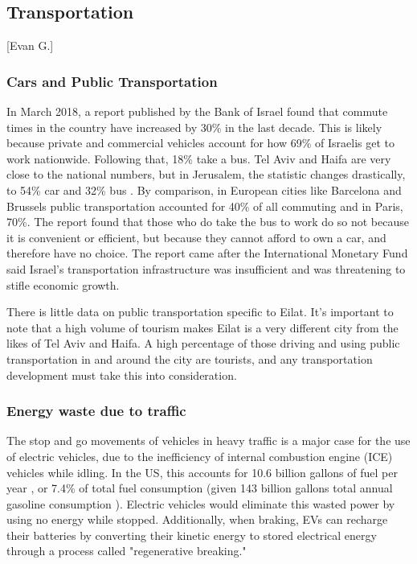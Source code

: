 \documentclass[12pt]{article}                         %
\begin{document}
\subsection{Transportation}[Evan G.]
\subsubsection{Cars and Public Transportation}
In March 2018, a report published by the Bank of Israel found that commute times in the country have increased by 30\% in the last decade. This is likely because private and commercial vehicles account for how 69\% of Israelis get to work nationwide. Following that, 18\% take a bus. Tel Aviv and Haifa are very close to the national numbers, but in Jerusalem, the statistic changes drastically, to 54\% car and 32\% bus \cite{Dori2018IsraeliRoads}. By comparison, in European cities like Barcelona and Brussels public transportation accounted for 40\% of all commuting and in Paris, 70\%. The report found that those who do take the bus to work do so not because it is convenient or efficient, but because they cannot afford to own a car, and therefore have no choice. The report came after the International Monetary Fund said Israel’s transportation infrastructure was insufficient and was threatening to stifle economic growth. 

There is little data on public transportation specific to Eilat. It's important to note that a high volume of tourism makes Eilat is a very different city from the likes of Tel Aviv and Haifa. A high percentage of those driving and using public transportation in and around the city are tourists, and any transportation development must take this into consideration.

\subsubsection{Energy waste due to traffic}
The stop and go movements of vehicles in heavy traffic is a major case for the use of electric vehicles, due to the inefficiency of internal combustion engine (ICE) vehicles while idling. In the US, this accounts for 10.6 billion gallons of fuel per year \cite{Carrico2009CostlyVehicles}, or 7.4\% of total fuel consumption (given 143 billion gallons total annual gasoline consumption \cite{Administration2018HowConsume}). Electric vehicles would eliminate this wasted power by using no energy while stopped. Additionally, when braking, EVs can recharge their batteries by converting their kinetic energy to stored electrical energy through a process called "regenerative breaking."
\end{document}
